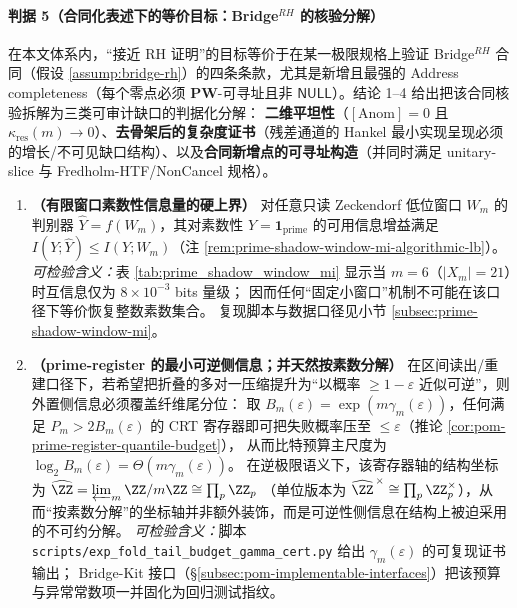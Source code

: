 \paragraph{判据 5（合同化表述下的等价目标：Bridge\(^{RH}\) 的核验分解）}
在本文体系内，“接近 RH 证明”的目标等价于在某一极限规格上验证 Bridge\(^{RH}\) 合同（假设 \ref{assump:bridge-rh}）的四条条款，尤其是新增且最强的 Address completeness（每个零点必须 \(\mathbf{PW}\)-可寻址且非 \(\mathsf{NULL}\)）。结论 1--4 给出把该合同核验拆解为三类可审计缺口的判据化分解：
\textbf{二维平坦性}（\([\mathrm{Anom}]=0\) 且 \(\kappa_{\mathrm{res}}(m)\to 0\)）、\textbf{去骨架后的复杂度证书}（残差通道的 Hankel 最小实现呈现必须的增长/不可见缺口结构）、以及\textbf{合同新增点的可寻址构造}（并同时满足 unitary-slice 与 Fredholm-HTF/NonCancel 规格）。
\begin{enumerate}
  \item \textbf{（有限窗口素数性信息量的硬上界）}
  对任意只读 Zeckendorf 低位窗口 \(W_m\) 的判别器 \(\widehat Y=f(W_m)\)，其对素数性 \(Y=\mathbf{1}_{\mathrm{prime}}\) 的可用信息增益满足
  \(I(Y;\widehat Y)\le I(Y;W_m)\)（注 \ref{rem:prime-shadow-window-mi-algorithmic-lb}）。
  \emph{可检验含义：}表 \ref{tab:prime_shadow_window_mi} 显示当 \(m=6\)（\(|X_m|=21\)）时互信息仅为 \(8\times 10^{-3}\) bits 量级；
  因而任何“固定小窗口”机制不可能在该口径下等价恢复整数素数集合。
  复现脚本与数据口径见小节 \ref{subsec:prime-shadow-window-mi}。

  \item \textbf{（prime-register 的最小可逆侧信息；并天然按素数分解）}
  在区间读出/重建口径下，若希望把折叠的多对一压缩提升为“以概率 \(\ge 1-\varepsilon\) 近似可逆”，则外置侧信息必须覆盖纤维尾分位：
  取 \(B_m(\varepsilon)=\exp(m\gamma_m(\varepsilon))\)，任何满足 \(P_m>2B_m(\varepsilon)\) 的 CRT 寄存器即可把失败概率压至 \(\le\varepsilon\)（推论 \ref{cor:pom-prime-register-quantile-budget}），
  从而比特预算主尺度为 \(\log_2 B_m(\varepsilon)=\Theta(m\gamma_m(\varepsilon))\)。
  在逆极限语义下，该寄存器轴的结构坐标为
  \(
  \widehat{\ZZ}=\varprojlim_m \ZZ/m\ZZ\cong \prod_{p}\ZZ_p
  \)
  （单位版本为 \(\widehat{\ZZ}^{\,\times}\cong\prod_p\ZZ_p^{\times}\)），从而“按素数分解”的坐标轴并非额外装饰，而是可逆性侧信息在结构上被迫采用的不可约分解。
  \emph{可检验含义：}脚本 \texttt{scripts/exp\_fold\_tail\_budget\_gamma\_cert.py} 给出 \(\gamma_m(\varepsilon)\) 的可复现证书输出；
  Bridge-Kit 接口（\S\ref{subsec:pom-implementable-interfaces}）把该预算与异常常数项一并固化为回归测试指纹。


\end{enumerate}
